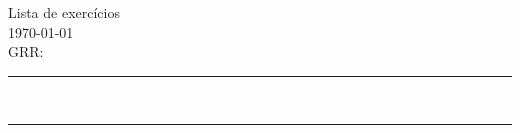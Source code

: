 \documentclass[a4paper]{article}
\theoremstyle{exercicio}
\newtheorem{ex}{}[]         %
\newcommand{\HRule}{
  \noindent\rule{\linewidth}{0.2mm}
}
\begin{document}
\pagestyle{empty}

\begin{center}
  {\Large Lista de exercícios}\\ \today\\ GRR: \grr{}
\end{center}

\begin{center}
  \noindent\rule{0.8\linewidth}{0.2mm}\\
  \vspace*{-1em}
  \noindent\rule{0.5\linewidth}{0.2mm}
\end{center}


\foreachproblem[ex]{
  \begin{ex}
    \label{prob:\thisproblemlabel}
    \thisproblem
  \end{ex}
  \HRule
}
\end{document}
